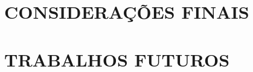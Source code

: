 
\chapter{CONSIDERAÇÕES FINAIS}
\label{chap:conclusao}


\chapter{TRABALHOS FUTUROS}
\label{sec:trabalhosFuturos}


